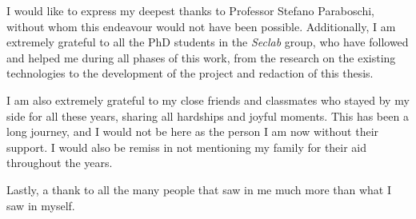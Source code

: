 I would like to express my deepest thanks to Professor Stefano Paraboschi, without whom
this endeavour would not have been possible.
Additionally, I am extremely grateful to all the PhD students in the \textit{Seclab} group,
who have followed and helped me during all phases of this work, from the research on
the existing technologies to the development of the project and redaction of this thesis.

I am also extremely grateful to my close friends and classmates who stayed by my side
for all these years, sharing all hardships and joyful moments.
This has been a long journey, and I would not be here as the person I am now
without their support.
I would also be remiss in not mentioning my family for their aid throughout the years.

Lastly, a thank to all the many people that saw in me much more than what I saw in myself.